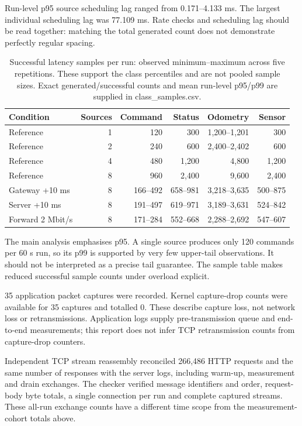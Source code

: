 Run-level p95 source scheduling lag ranged from 0.171--4.133 ms. The largest individual scheduling lag was 77.109 ms. Rate checks and scheduling lag should be read together: matching the total generated count does not demonstrate perfectly regular spacing.

\begin{table}[H]
\centering\small
\setlength{\tabcolsep}{4pt}
\begin{tabular}{lrrrrr}
\hline
Condition & Sources & Command & Status & Odometry & Sensor \\
\hline
Reference & 1 & 120 & 300 & 1,200--1,201 & 300 \\
Reference & 2 & 240 & 600 & 2,400--2,402 & 600 \\
Reference & 4 & 480 & 1,200 & 4,800 & 1,200 \\
Reference & 8 & 960 & 2,400 & 9,600 & 2,400 \\
Gateway +10 ms & 8 & 166--492 & 658--981 & 3,218--3,635 & 500--875 \\
Server +10 ms & 8 & 191--497 & 619--971 & 3,189--3,631 & 524--842 \\
Forward 2 Mbit/s & 8 & 171--284 & 552--668 & 2,288--2,692 & 547--607 \\
\hline
\end{tabular}
\caption{Successful latency samples per run: observed minimum--maximum across five repetitions. These support the class percentiles and are not pooled sample sizes. Exact generated/successful counts and mean run-level p95/p99 are supplied in class\_samples.csv.}
\label{tab:e1r-samples}
\end{table}


The main analysis emphasises p95. A single source produces only 120 commands per 60 s run, so its p99 is supported by very few upper-tail observations. It should not be interpreted as a precise tail guarantee. The sample table makes reduced successful sample counts under overload explicit.

35 application packet captures were recorded. Kernel capture-drop counts were available for 35 captures and totalled 0. These describe capture loss, not network loss or retransmissions. Application logs supply pre-transmission queue and end-to-end measurements; this report does not infer TCP retransmission counts from capture-drop counters.

Independent TCP stream reassembly reconciled 266,486 HTTP requests and the same number of responses with the server logs, including warm-up, measurement and drain exchanges. The checker verified message identifiers and order, request-body byte totals, a single connection per run and complete captured streams. These all-run exchange counts have a different time scope from the measurement-cohort totals above.

